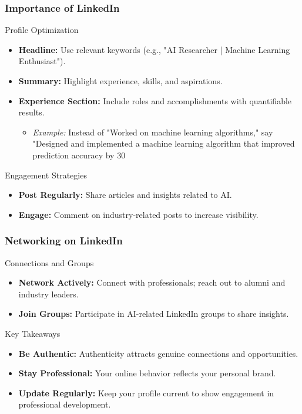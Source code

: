\documentclass{beamer}
\begin{document}
\begin{frame}[fragile]
    \frametitle{Importance of LinkedIn}
    \begin{block}{Profile Optimization}
        \begin{itemize}
            \item \textbf{Headline:} Use relevant keywords (e.g., "AI Researcher | Machine Learning Enthusiast").
            \item \textbf{Summary:} Highlight experience, skills, and aspirations.
            \item \textbf{Experience Section:} Include roles and accomplishments with quantifiable results.
            \begin{itemize}
                \item \textit{Example:} Instead of "Worked on machine learning algorithms," say "Designed and implemented a machine learning algorithm that improved prediction accuracy by 30%
            \end{itemize}
        \end{itemize}
    \end{block}
    
    \begin{block}{Engagement Strategies}
        \begin{itemize}
            \item \textbf{Post Regularly:} Share articles and insights related to AI.
            \item \textbf{Engage:} Comment on industry-related posts to increase visibility.
        \end{itemize}
    \end{block}
\end{frame}

\begin{frame}[fragile]
    \frametitle{Networking on LinkedIn}
    \begin{block}{Connections and Groups}
        \begin{itemize}
            \item \textbf{Network Actively:} Connect with professionals; reach out to alumni and industry leaders.
            \item \textbf{Join Groups:} Participate in AI-related LinkedIn groups to share insights.
        \end{itemize}
    \end{block}
    
    \begin{block}{Key Takeaways}
        \begin{itemize}
            \item \textbf{Be Authentic:} Authenticity attracts genuine connections and opportunities.
            \item \textbf{Stay Professional:} Your online behavior reflects your personal brand.
            \item \textbf{Update Regularly:} Keep your profile current to show engagement in professional development.
        \end{itemize}
    \end{block}
\end{frame}
\end{document}
